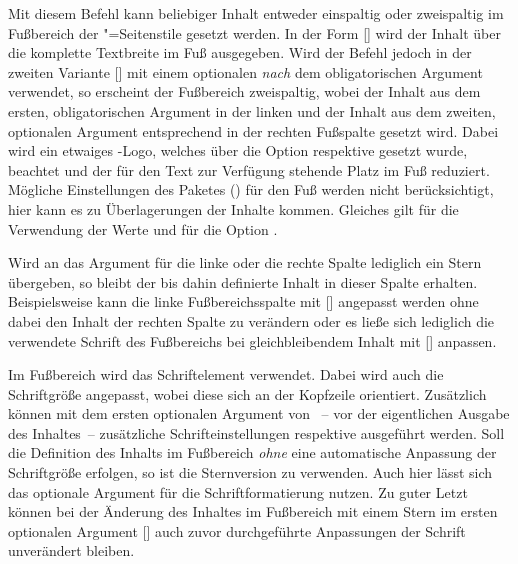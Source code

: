 \begin{DeclareEntity*}{}
\begin{DeclareEntity*}{}
\begin{DeclareEntity*}{}
\begin{Declaration}
\begin{Declaration}
Mit diesem Befehl kann beliebiger Inhalt entweder einspaltig oder zweispaltig 
im Fußbereich der "=Seitenstile gesetzt werden. In der 
Form [] wird der Inhalt über die komplette 
Textbreite im Fuß ausgegeben. Wird der Befehl jedoch in der zweiten Variante 
[] mit einem 
optionalen \emph{nach} dem obligatorischen Argument verwendet, so erscheint der 
Fußbereich zweispaltig, wobei der Inhalt aus dem ersten, obligatorischen 
Argument in der linken und der Inhalt aus dem zweiten, optionalen Argument 
entsprechend in der rechten Fußspalte gesetzt wird. Dabei wird ein etwaiges 
\DDC-Logo, welches über die Option  respektive  
gesetzt wurde, beachtet und der für den Text zur Verfügung stehende Platz im 
Fuß reduziert. Mögliche Einstellungen des Paketes
() für den Fuß werden nicht 
berücksichtigt, hier kann es zu Überlagerungen der Inhalte kommen. Gleiches 
gilt für die Verwendung der Werte  und  für die 
Option .

%
Wird an das Argument für die linke oder die rechte Spalte lediglich ein Stern 
\PValue{*} übergeben, so bleibt der bis dahin definierte Inhalt in dieser 
Spalte erhalten. Beispielsweise kann die linke Fußbereichsspalte mit 
[\OPValue{*}] angepasst werden ohne dabei den 
Inhalt der rechten Spalte zu verändern oder es ließe sich lediglich die 
verwendete Schrift des Fußbereichs bei gleichbleibendem Inhalt mit 
[\MPValue{*}\OPValue{*}] anpassen.

%
Im Fußbereich wird das Schriftelement  verwendet. Dabei wird 
auch die Schriftgröße angepasst, wobei diese sich an der Kopfzeile orientiert. 
Zusätzlich können mit dem ersten optionalen Argument von ~-- 
vor der eigentlichen Ausgabe des Inhaltes~-- zusätzliche Schrifteinstellungen 
respektive  ausgeführt werden. Soll die Definition des 
Inhalts im Fußbereich \emph{ohne} eine automatische Anpassung der Schriftgröße 
erfolgen, so ist die Sternversion  zu verwenden. Auch hier 
lässt sich das optionale Argument für die Schriftformatierung nutzen.
%
Zu guter Letzt können bei der Änderung des Inhaltes im Fußbereich mit einem 
Stern im ersten optionalen Argument 
[\OPValue{*}] auch zuvor 
durchgeführte Anpassungen der Schrift unverändert bleiben.
\end{Declaration}
\end{Declaration}


\end{DeclareEntity*}
\end{DeclareEntity*}
\end{DeclareEntity*}
